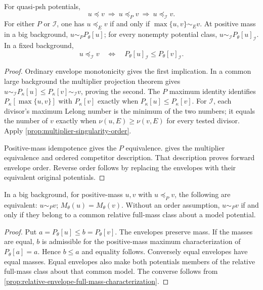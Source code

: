 \begin{proposition}\label{prop:singularity-order-chain-and-joins}
For quasi-psh potentials,
\[
 u\preceq v\ \Longrightarrow\ u\preceq_P v
                      \ \Longrightarrow\ u\preceq_{\mathcal I}v.
\]
For either $P$ or $\mathcal I$, one has $u\preceq_E v$ if and only if $\max\{u,v\}\sim_E v$. At positive mass in a big background, $u\sim_P P_\theta[u]$; for every nonempty potential class, $u\sim_{\mathcal I}P_\theta[u]_{\mathcal I}$. In a fixed background,
\[
 u\preceq_{\mathcal I}v
 \quad\Longleftrightarrow\quad
 P_\theta[u]_{\mathcal I}\leq P_\theta[v]_{\mathcal I}.
\]
\end{proposition}
\begin{proof}
Ordinary envelope monotonicity gives the first implication. In a common large background the multiplier projection theorem gives
$u\sim_{\mathcal I}P_\kappa[u]\leq P_\kappa[v]\sim_{\mathcal I}v$, proving the second. The $P$ maximum identity identifies $P_\kappa[\max\{u,v\}]$ with $P_\kappa[v]$ exactly when $P_\kappa[u]\leq P_\kappa[v]$. For $\mathcal I$, each divisor's maximum Lelong number is the minimum of the two numbers; it equals the number of $v$ exactly when $\nu(u,E)\geq\nu(v,E)$ for every tested divisor. Apply \cref{prop:multiplier-singularity-order}.

Positive-mass idempotence gives the $P$ equivalence.  gives the multiplier equivalence and ordered competitor description. That description proves forward envelope order. Reverse order follows by replacing the envelopes with their equivalent original potentials.
\end{proof}

\begin{proposition}\label{prop:p-equivalence-positive-mass}
In a big background, for positive-mass $u,v$ with $u\preceq_P v$, the following are equivalent: $u\sim_P v$; $M_\theta(u)=M_\theta(v)$. Without an order assumption, $u\sim_P v$ if and only if they belong to a common relative full-mass class about a model potential.
\end{proposition}
\begin{proof}
Put $a=P_\theta[u]\leq b=P_\theta[v]$. The envelopes preserve mass. If the masses are equal, $b$ is admissible for the positive-mass maximum characterization of $P_\theta[a]=a$. Hence $b\leq a$ and equality follows. Conversely equal envelopes have equal masses. Equal envelopes also make both potentials members of the relative full-mass class about that common model. The converse follows from \cref{prop:relative-envelope-full-mass-characterization}.
\end{proof}

